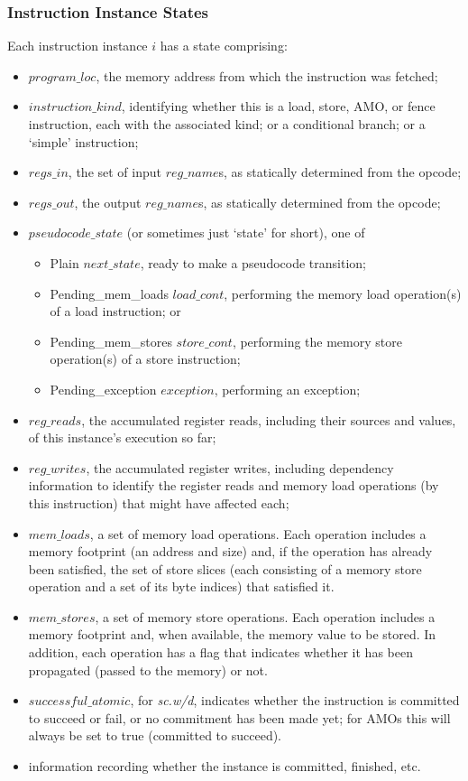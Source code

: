 \subsubsection{Instruction Instance States}\label{sec:omm:inst_state}
Each instruction instance $i$ has a state comprising:
\begin{itemize}
\item $program\_loc$, the memory address from which the instruction was fetched;
\item $instruction\_kind$, identifying whether this is a load, store, AMO, or fence instruction, each with the associated kind; or a conditional branch; or a `simple' instruction;
\item $regs\_in$, the set of input $reg\_name$s, as statically determined from the opcode;
\item $regs\_out$, the output $reg\_name$s, as statically determined from the opcode;
\item $pseudocode\_state$ (or sometimes just `state' for short), one of
  \begin{itemize}
  \item {\sc Plain} $next\_state$, ready to make a pseudocode transition;
  \item {\sc Pending\_mem\_loads} $load\_cont$, performing the memory load operation(s) of a load instruction; or
  \item {\sc Pending\_mem\_stores} $store\_cont$, performing the memory store operation(s) of a store instruction;
  \item {\sc Pending\_exception} $exception$, performing an exception;
  \end{itemize}
\item $reg\_reads$, the accumulated register reads, including their sources and values, of this instance's execution so far;
\item $reg\_writes$, the accumulated register writes, including dependency information to identify the register reads and memory load operations (by this instruction) that might have affected each;
\item $mem\_loads$, a set of memory load operations.
Each operation includes a memory footprint (an address and size) and, if the operation has already been satisfied, the set of store slices (each consisting of a memory store operation and a set of its byte indices) that satisfied it.
\item $mem\_stores$, a set of memory store operations.
Each operation includes a memory footprint and, when available, the memory value to be stored.
In addition, each operation has a flag that indicates whether it has been propagated (passed to the memory) or not.
\item $successful\_atomic$, for {\em sc.w/d}, indicates whether the instruction is committed to succeed or fail, or no commitment has been made yet; for AMOs this will always be set to true (committed to succeed).
\item information recording whether the instance is committed, finished, etc.
\end{itemize}

